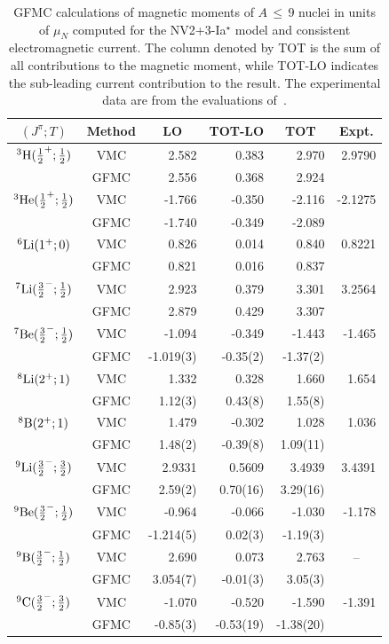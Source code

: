 \documentclass[aps,prc,floatfix,showpacs,twocolumn, preprintnumbers]{revtex4-2}
\newcommand{\mc}[1]{\multicolumn{1}{c}{#1}}
\begin{document}
\begin{table}[tbh]
\begin{center}
\begin{tabular} {c c *{4}{d{3.6}}}\hline \hline 
$(J^\pi;T)$& Method&\mc{LO} &\mc{TOT-LO} &\mc{TOT} &\mc{Expt.} \\ \hline
$^3{\rm H}(\frac{1}{2}^+;\frac{1}{2})$ &VMC &2.582 &0.383 &2.970 &2.9790\\
&GFMC &2.556 &0.368 &2.924 &\\ 
$^3{\rm He}(\frac{1}{2}^+;\frac{1}{2})$ &VMC &-1.766 &-0.350 &-2.116 &-2.1275\\
&GFMC &-1.740 & -0.349 &-2.089 &\\
$^6{\rm Li}(1^+;0)$ &VMC &0.826 &0.014 &0.840 &0.8221\\
&GFMC &0.821 &0.016 &0.837 &\\
$^7{\rm Li}(\frac{3}{2}^-;\frac{1}{2})$ &VMC &2.923 &0.379 &3.301 &3.2564\\
&GFMC &2.879 &0.429 &3.307 &\\
$^7{\rm Be}(\frac{3}{2}^-;\frac{1}{2})$ &VMC &-1.094 &-0.349 &-1.443 &-1.465 \\
&GFMC &-1.019(3) &-0.35(2) &-1.37(2) \\
$^8{\rm Li}(2^+;1)$ &VMC &1.332 &0.328 &1.660 &1.654 \\
&GFMC &1.12(3) &0.43(8) &1.55(8) &\\
$^8{\rm B}(2^+;1)$ &VMC &1.479 &-0.302 &1.028 &1.036\\
&GFMC &1.48(2) &-0.39(8) &1.09(11) &\\
$^9{\rm Li}(\frac{3}{2}^-;\frac{3}{2})$ &VMC &2.9331 &0.5609 &3.4939 &3.4391\\
&GFMC &2.59(2) &0.70(16) &3.29(16) & \\
$^9{\rm Be}(\frac{3}{2}^-;\frac{1}{2})$ &VMC &-0.964 & -0.066 & -1.030 &-1.178\\
&GFMC &-1.214(5) &0.02(3) &-1.19(3) & \\
$^9{\rm B}(\frac{3}{2}^-;\frac{1}{2})$ &VMC &2.690 & 0.073 & 2.763 &\mc{--} \\
&GFMC &3.054(7) &-0.01(3) &3.05(3)\\
$^9{\rm C}(\frac{3}{2}^-;\frac{3}{2})$ &VMC &-1.070 & -0.520 &-1.590 &-1.391\\
&GFMC &-0.85(3) &-0.53(19) & -1.38(20) \\ \hline \hline
\end{tabular}
\end{center}
\caption{GFMC calculations of magnetic moments of $A\,\le\,9$ nuclei in units of $\mu_N$ computed for the NV2+3-Ia$^{\star}$ model  and consistent electromagnetic current. The column denoted by TOT is the sum of all contributions to the magnetic moment, while TOT-LO indicates the sub-leading current contribution to the result. The experimental data are from the evaluations of~\cite{Purcell:2010hka,Tilley:2002vg,Tilley:2004zz,Borremans:2005ar}.}
\label{tab:gfmc.mm.light}
\end{table}
\end{document}
